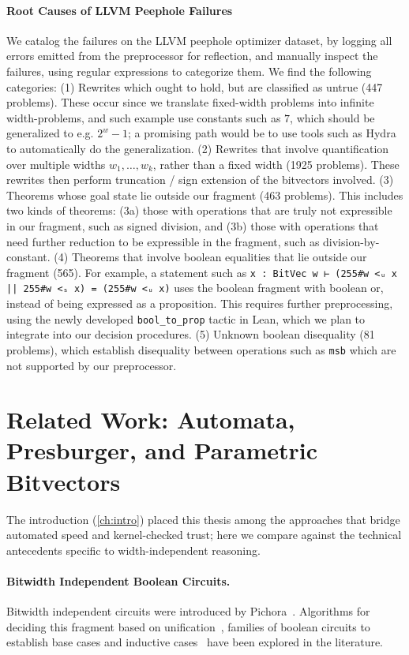 \paragraph{Root Causes of LLVM Peephole Failures}
We catalog the failures on the LLVM peephole optimizer dataset,
by logging all errors emitted from the preprocessor for reflection,
and manually inspect the failures, using regular expressions to categorize them.
We find the following categories: (1) Rewrites which ought to hold, but are classified as untrue (447 problems).
These occur since we translate fixed-width problems into infinite width-problems, and such example use constants such as $7$,
which should be generalized to e.g. $2^w - 1$; a promising path would be to use
tools such as Hydra~\citep{hydra} to automatically do the
generalization.
(2) Rewrites that involve quantification over multiple widths $w_1, \dots, w_k$, rather than a fixed width (1925 problems).
These rewrites then perform truncation / sign extension of the bitvectors involved.
(3) Theorems whose goal state lie outside our fragment (463 problems). This includes two kinds of theorems:
(3a) those with operations that are truly not expressible in our fragment, such as signed division,
and (3b) those with operations that need further reduction to be expressible in the fragment, such as division-by-constant.
(4) Theorems that involve boolean equalities that lie outside our fragment (565).
For example, a statement such as \texttt{x : BitVec w ⊢ (255\#w <ᵤ x || 255\#w <ₛ x) = (255\#w <ᵤ x)} uses the
boolean fragment with boolean or, instead of being expressed as a proposition.
This requires further preprocessing, using the newly developed \texttt{bool\_to\_prop} tactic in Lean,
which we plan to integrate into our decision procedures.
(5) Unknown boolean disequality (81 problems), which establish disequality between operations such as \texttt{msb}
which are not supported by our preprocessor.
%


\section{Related Work: Automata, Presburger, and Parametric Bitvectors}
\label{sec:mono:related}

The introduction (\cref{ch:intro}) placed this thesis among the approaches that bridge
automated speed and kernel-checked trust; here we compare against the technical
antecedents specific to width-independent reasoning.

\paragraph{Bitwidth Independent Boolean Circuits.}
Bitwidth independent circuits were introduced by Pichora~\cite{pichora2003automated}.
Algorithms for deciding this fragment based on unification~\cite{bjorner1998deciding},
families of boolean circuits to establish base cases and inductive cases~\citep{gupta1993parametric,gupta1993representation}
have been explored in the literature.

